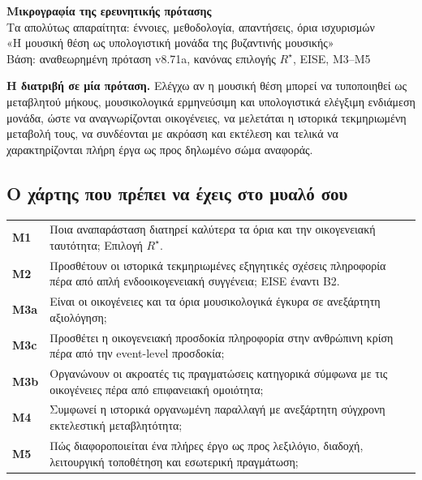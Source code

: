 \documentclass[9pt,a4paper]{extarticle}
\begin{document}

\begin{center}
{\sffamily\bfseries\LARGE Μικρογραφία της ερευνητικής πρότασης}\\[3mm]
{\sffamily\Large Τα απολύτως απαραίτητα: έννοιες, μεθοδολογία, απαντήσεις, όρια ισχυρισμών}\\[2mm]
{\large «Η μουσική θέση ως υπολογιστική μονάδα της βυζαντινής μουσικής»}\\[4mm]
{\small Βάση: αναθεωρημένη πρόταση v8.71a, κανόνας επιλογής \(R^\star\), EISE, M3--M5}
\end{center}

\begin{keybox}
\textbf{Η διατριβή σε μία πρόταση.} Ελέγχω αν η μουσική θέση μπορεί να τυποποιηθεί ως μεταβλητού μήκους, μουσικολογικά ερμηνεύσιμη και υπολογιστικά ελέγξιμη ενδιάμεση μονάδα, ώστε να αναγνωρίζονται οικογένειες, να μελετάται η ιστορικά τεκμηριωμένη μεταβολή τους, να συνδέονται με ακρόαση και εκτέλεση και τελικά να χαρακτηρίζονται πλήρη έργα ως προς δηλωμένο σώμα αναφοράς.
\end{keybox}

\subsection*{Ο χάρτης που πρέπει να έχεις στο μυαλό σου}
\begin{center}
\begin{tabularx}{.95\linewidth}{>{\bfseries\sffamily}p{1.25cm}X}
M1 & Ποια αναπαράσταση διατηρεί καλύτερα τα όρια και την οικογενειακή ταυτότητα; Επιλογή \(R^\star\).\\
M2 & Προσθέτουν οι ιστορικά τεκμηριωμένες εξηγητικές σχέσεις πληροφορία πέρα από απλή ενδοοικογενειακή συγγένεια; EISE έναντι B2.\\
M3a & Είναι οι οικογένειες και τα όρια μουσικολογικά έγκυρα σε ανεξάρτητη αξιολόγηση;\\
M3c & Προσθέτει η οικογενειακή προσδοκία πληροφορία στην ανθρώπινη κρίση πέρα από την event-level προσδοκία;\\
M3b & Οργανώνουν οι ακροατές τις πραγματώσεις κατηγορικά σύμφωνα με τις οικογένειες πέρα από επιφανειακή ομοιότητα;\\
M4 & Συμφωνεί η ιστορικά οργανωμένη παραλλαγή με ανεξάρτητη σύγχρονη εκτελεστική μεταβλητότητα;\\
M5 & Πώς διαφοροποιείται ένα πλήρες έργο ως προς λεξιλόγιο, διαδοχή, λειτουργική τοποθέτηση και εσωτερική πραγμάτωση;\\
\end{tabularx}
\end{center}
\end{document}

